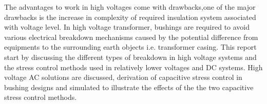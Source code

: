 The advantages to work in high voltages come with drawbacks,one of the major drawbacks is the increase in complexity of required insulation system associated with voltage level. In high voltage transformer, bushings are required to avoid various electrical breakdown mechanisms caused by the potential difference from equipments to the surrounding earth objects i.e. transformer casing. This report start by discussing the different types of breakdown in high voltage systems and the stress control methods used in relatively lower voltages and DC systems. High voltage AC solutions are discussed, derivation of capacitive stress control in bushing designs and simulated to illustrate the effects of the the two capacitive stress control methods. 